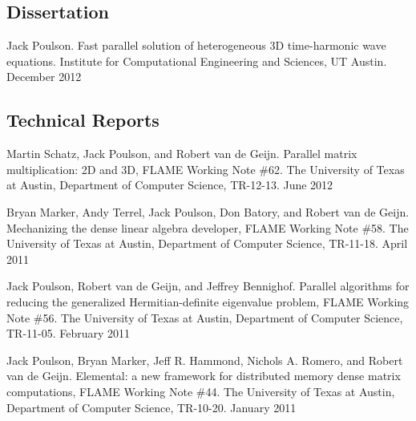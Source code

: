 \documentclass[letterpaper]{article}
\renewenvironment{itemize}{
  \begin{list}{}{
    \setlength{\leftmargin}{1.5em}
  }
}{
  \end{list}
}
\begin{document}
%

\subsection*{Dissertation}
\begin{itemize}
\item Jack Poulson. Fast parallel solution of heterogeneous 3D time-harmonic wave equations. 
      Institute for Computational Engineering and Sciences, UT Austin. December 2012
\end{itemize}

\subsection*{Technical Reports}

\begin{itemize}

\item Martin Schatz, Jack Poulson, and Robert van de Geijn. 
      Parallel matrix multiplication: 2D and 3D, FLAME Working Note \#62. 
      The University of Texas at Austin, Department of Computer Science, 
      TR-12-13. June 2012

\item Bryan Marker, Andy Terrel, Jack Poulson, Don Batory, and 
      Robert van de Geijn. Mechanizing the dense linear algebra developer, 
      FLAME Working Note \#58. 
      The University of Texas at Austin, Department of Computer Science, 
      TR-11-18. April 2011

\item Jack Poulson, Robert van de Geijn, and Jeffrey Bennighof. 
      Parallel algorithms for reducing the generalized Hermitian-definite 
      eigenvalue problem, FLAME Working Note \#56.
      The University of Texas at Austin, Department of Computer Science,
      TR-11-05. February 2011

\item Jack Poulson, Bryan Marker, Jeff R. Hammond, Nichols A. Romero, and 
      Robert van de Geijn. Elemental: a new framework for distributed memory 
      dense matrix computations, FLAME Working Note \#44.
      The University of Texas at Austin, Department of Computer Science,
      TR-10-20. January 2011

\end{itemize}
\end{document}
